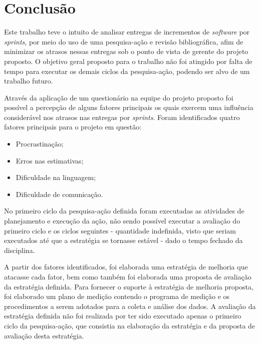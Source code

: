 \chapter{Conclusão}

Este trabalho teve o intuito de analisar entregas de incrementos de \textit{software} por \textit{sprints},
por meio do uso de uma pesquisa-ação e revisão bibliográfica, 
afim de minimizar os atrasos nessas entregas sob o ponto de vista de gerente do projeto proposto.
O objetivo geral proposto para o trabalho não foi atingido por falta de tempo para executar os demais ciclos
da pesquisa-ação, podendo ser alvo de um trabalho futuro.

Através da aplicação de um questionário na equipe do projeto proposto foi possível a percepção de alguns fatores principais
os quais exercem uma influência considerável nos atrasos nas entregas por \textit{sprints}. Foram identificados quatro
fatores principais para o projeto em questão:

\begin{itemize}
  \item Procrastinação;
  \item Erros nas estimativas;
  \item Dificuldade na linguagem;
  \item Dificuldade de comunicação.
\end{itemize}


No primeiro ciclo da pesquisa-ação definida foram executadas as atividades de planejamento e execução da ação, não sendo possível
executar a avaliação do primeiro ciclo e os ciclos seguintes - quantidade indefinida, visto que seriam
executados até que a estratégia se tornasse estável - dado o tempo fechado da disciplina.

A partir dos fatores identificados, foi elaborada uma estratégia de melhoria que atacasse cada fator,
bem como também foi elaborada uma proposta de avaliação da estratégia definida.
Para fornecer o suporte à estratégia de melhoria proposta, foi elaborado um plano de medição contendo
o programa de medição e os procedimentos a serem adotados para a coleta e análise dos dados.
A avaliação da estratégia definida não foi realizada por ter sido executado apenas o primeiro ciclo da pesquisa-ação,
que consistia na elaboração da estratégia e da proposta de avaliação desta estratégia.

